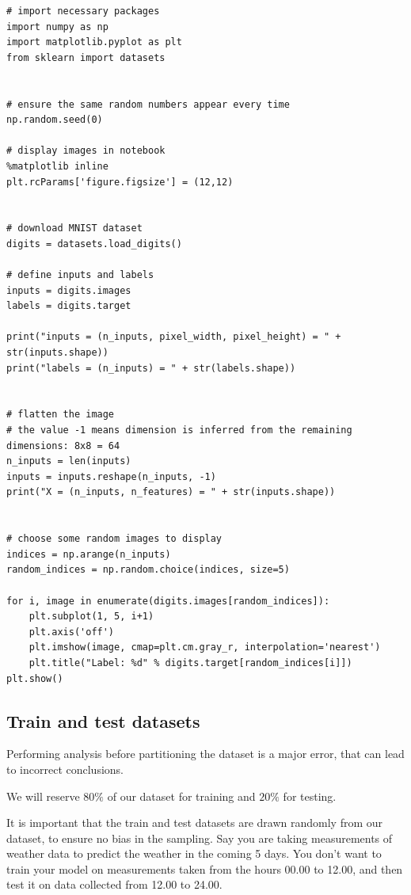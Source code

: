 \documentclass[%
oneside,                 %
final,                   %
10pt]{article}
\begin{document}
\begin{verbatim}
# import necessary packages
import numpy as np
import matplotlib.pyplot as plt
from sklearn import datasets


# ensure the same random numbers appear every time
np.random.seed(0)

# display images in notebook
%matplotlib inline
plt.rcParams['figure.figsize'] = (12,12)


# download MNIST dataset
digits = datasets.load_digits()

# define inputs and labels
inputs = digits.images
labels = digits.target

print("inputs = (n_inputs, pixel_width, pixel_height) = " + str(inputs.shape))
print("labels = (n_inputs) = " + str(labels.shape))


# flatten the image
# the value -1 means dimension is inferred from the remaining dimensions: 8x8 = 64
n_inputs = len(inputs)
inputs = inputs.reshape(n_inputs, -1)
print("X = (n_inputs, n_features) = " + str(inputs.shape))


# choose some random images to display
indices = np.arange(n_inputs)
random_indices = np.random.choice(indices, size=5)

for i, image in enumerate(digits.images[random_indices]):
    plt.subplot(1, 5, i+1)
    plt.axis('off')
    plt.imshow(image, cmap=plt.cm.gray_r, interpolation='nearest')
    plt.title("Label: %d" % digits.target[random_indices[i]])
plt.show()
\end{verbatim}

\subsection*{Train and test datasets}

Performing analysis before partitioning the dataset is a major error, that can lead to incorrect conclusions.  

We will reserve $80 \%$ of our dataset for training and $20 \%$ for testing.  

It is important that the train and test datasets are drawn randomly from our dataset, to ensure
no bias in the sampling.  
Say you are taking measurements of weather data to predict the weather in the coming 5 days.
You don't want to train your model on measurements taken from the hours 00.00 to 12.00, and then test it on data
collected from 12.00 to 24.00.
\end{document}
